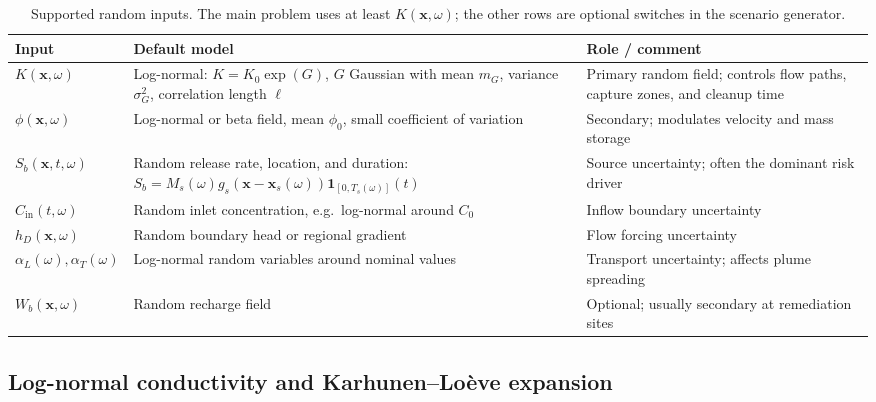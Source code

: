\documentclass[11pt]{article}
\numberwithin{equation}{section}
\newcommand{\xx}{\mathbf{x}}
\newcommand{\ind}{\mathbf{1}}
\newcommand{\tabhead}[1]{\textbf{#1}}
\theoremstyle{plain}
\begin{document}
\begin{table}[htbp]
\centering
\small
\begin{tabularx}{\textwidth}{@{}lYY@{}}
\toprule
\tabhead{Input} & \tabhead{Default model} & \tabhead{Role / comment}\\
\midrule
$K(\xx,\omega)$ & Log-normal:
$K=K_0\exp(G)$, $G$ Gaussian with mean $m_G$, variance $\sigma_G^2$,
correlation length $\ell$ & Primary random field; controls flow paths,
capture zones, and cleanup time\\
$\phi(\xx,\omega)$ & Log-normal or beta field, mean $\phi_0$, small
coefficient of variation & Secondary; modulates velocity and mass storage\\
$S_b(\xx,t,\omega)$ & Random release rate, location, and duration:
$S_b=M_s(\omega)g_s(\xx-\xx_s(\omega))\ind_{[0,T_s(\omega)]}(t)$ &
Source uncertainty; often the dominant risk driver\\
$C_{\mathrm{in}}(t,\omega)$ & Random inlet concentration, e.g.\ log-normal
around $C_0$ & Inflow boundary uncertainty\\
$h_D(\xx,\omega)$ & Random boundary head or regional gradient & Flow
forcing uncertainty\\
$\alpha_L(\omega),\alpha_T(\omega)$ & Log-normal random variables around
nominal values & Transport uncertainty; affects plume spreading\\
$W_b(\xx,\omega)$ & Random recharge field & Optional; usually secondary at
remediation sites\\
\bottomrule
\end{tabularx}
\caption{Supported random inputs.  The main problem uses at least
$K(\xx,\omega)$; the other rows are optional switches in the scenario
generator.}
\label{tab:random}
\end{table}

\subsection{Log-normal conductivity and Karhunen--Lo\`eve expansion}
\end{document}
